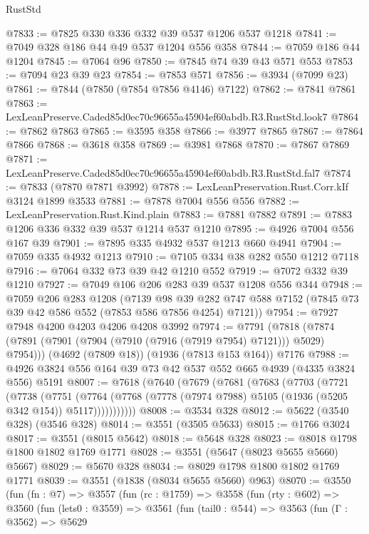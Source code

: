 \begin{lexlean}{RustStd}
\begin{coremodule}
@7833 := @7825 @330 @336 @332 @39 @537 @1206 @537 @1218
@7841 := @7049 @328 @186 @44 @49 @537 @1204 @556 @358
@7844 := @7059 @186 @44 @1204
@7845 := @7064 @96
@7850 := @7845 @74 @39 @43 @571 @553
@7853 := @7094 @23 @39 @23
@7854 := @7853 @571
@7856 := @3934 (@7099 @23)
@7861 := @7844 (@7850 (@7854 @7856 @4146) @7122)
@7862 := @7841 @7861
@7863 := LexLeanPreserve.Caded85d0ec70c96655a45904ef60abdb.R3.RustStd.look7
@7864 := @7862 @7863
@7865 := @3595 @358
@7866 := @3977 @7865
@7867 := @7864 @7866
@7868 := @3618 @358
@7869 := @3981 @7868
@7870 := @7867 @7869
@7871 := LexLeanPreserve.Caded85d0ec70c96655a45904ef60abdb.R3.RustStd.fal7
@7874 := @7833 (@7870 @7871 @3992)
@7878 := LexLeanPreservation.Rust.Corr.kIf @3124 @1899 @3533
@7881 := @7878 @7004 @556 @556
@7882 := LexLeanPreservation.Rust.Kind.plain
@7883 := @7881 @7882
@7891 := @7883 @1206 @336 @332 @39 @537 @1214 @537 @1210
@7895 := @4926 @7004 @556 @167 @39
@7901 := @7895 @335 @4932 @537 @1213 @660 @4941
@7904 := @7059 @335 @4932 @1213
@7910 := @7105 @334 @38 @282 @550 @1212 @7118
@7916 := @7064 @332 @73 @39 @42 @1210 @552
@7919 := @7072 @332 @39 @1210
@7927 := @7049 @106 @206 @283 @39 @537 @1208 @556 @344
@7948 := @7059
    @206
    @283
    @1208
    (@7139
      @98
      @39
      @282
      @747
      @588
      @7152
      (@7845 @73 @39 @42 @586 @552 (@7853 @586 @7856 @4254) @7121))
@7954 := @7927 @7948 @4200 @4203 @4206 @4208 @3992
@7974 := @7791
    (@7818 (@7874 (@7891 (@7901 (@7904 (@7910 (@7916 (@7919 @7954) @7121))) @5029) @7954)))
    (@4692 (@7809 @18))
    (@1936 (@7813 @153 @164))
    @7176
@7988 := @4926 @3824 @556 @164 @39 @73 @42 @537 @552 @665 @4939 (@4335 @3824 @556) @5191
@8007 := @7618
    (@7640
      (@7679
        (@7681
          (@7683
            (@7703
              (@7721
                (@7738
                  (@7751
                    (@7764
                      (@7768 (@7778 (@7974 @7988) @5105 (@1936 (@5205 @342 @154)) @5117)))))))))))
@8008 := @3534 @328
@8012 := @5622 (@3540 @328) (@3546 @328)
@8014 := @3551 (@3505 @5633)
@8015 := @1766 @3024
@8017 := @3551 (@8015 @5642)
@8018 := @5648 @328
@8023 := @8018 @1798 @1800 @1802 @1769 @1771
@8028 := @3551 (@5647 (@8023 @5655 @5660) @5667)
@8029 := @5670 @328
@8034 := @8029 @1798 @1800 @1802 @1769 @1771
@8039 := @3551 (@1838 (@8034 @5655 @5660) @963)
@8070 := @3550
    (fun (fn : @7) =>
    @3557
      (fun (rc : @1759) =>
      @3558
        (fun (rty : @602) =>
        @3560
          (fun (lets0 : @3559) =>
          @3561
            (fun (tail0 : @544) =>
            @3563
              (fun (Γ : @3562) =>
              @5629

\end{coremodule}
\end{lexlean}
